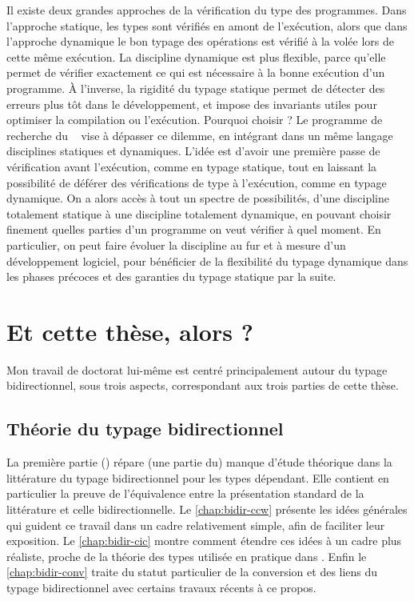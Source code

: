 Il existe deux grandes approches de la vérification du type des programmes.
Dans l’approche statique,
les types sont vérifiés en amont de l’exécution, alors que dans l’approche dynamique le bon typage des opérations est vérifié à la volée lors de cette même exécution.
La discipline dynamique est plus flexible, parce qu’elle permet de vérifier exactement ce qui est nécessaire à la bonne exécution d’un programme.
À l’inverse, la rigidité du typage statique permet de détecter des erreurs plus tôt dans le développement, et impose des invariants utiles pour optimiser la compilation ou l’exécution.
Pourquoi choisir ? Le programme de recherche du ~ vise à dépasser ce dilemme, en intégrant dans un même langage disciplines statiques et dynamiques.
L’idée est d’avoir une première passe de vérification avant l’exécution, comme en typage statique, tout en laissant la possibilité de déférer des vérifications de type à l’exécution, comme en typage dynamique.
On a alors accès à tout un spectre de possibilités, d’une discipline totalement statique à une discipline totalement dynamique,
en pouvant choisir finement quelles parties d’un programme on veut vérifier à quel moment. En particulier, on peut faire évoluer la discipline au fur et à mesure d’un développement logiciel, pour bénéficier de la flexibilité du typage dynamique dans les phases précoces et des garanties du typage statique par la suite.

\section{Et cette thèse, alors ?}
\label{sec:cette-these}

Mon travail de doctorat lui-même
est centré principalement autour du typage bidirectionnel, sous
trois aspects, correspondant aux trois parties de cette thèse.

\subsection{Théorie du typage bidirectionnel}

La première partie () répare (une partie du) manque d'étude
théorique dans la littérature du typage bidirectionnel pour les types dépendant. Elle contient en particulier la
preuve de l’équivalence entre la présentation standard de la littérature et celle
bidirectionnelle.
Le \cref{chap:bidir-ccw} présente les idées générales qui guident ce travail
dans un cadre relativement simple, afin de faciliter leur exposition. 
Le \cref{chap:bidir-cic} montre comment étendre ces idées à un
cadre plus réaliste, proche de la théorie des types utilisée en pratique dans .
Enfin le \cref{chap:bidir-conv} traite du statut particulier de la
conversion
et des liens du typage bidirectionnel avec certains travaux récents
à ce propos.

